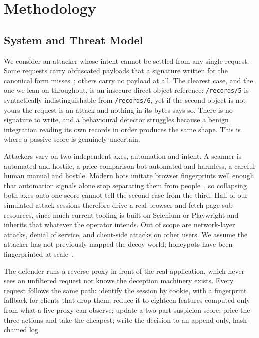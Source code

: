 \documentclass[runningheads]{llncs}
\begin{document}
\section{Methodology}

\subsection{System and Threat Model}
\label{sec:system}

We consider an attacker whose intent cannot be settled from any single request. Some
requests carry obfuscated payloads that a signature written for the canonical form
misses~\cite{amouei2022rat}; others carry no payload at all. The clearest case, and
the one we lean on throughout, is an insecure direct object reference:
\texttt{/records/5} is syntactically indistinguishable from \texttt{/records/6}, yet
if the second object is not yours the request is an attack and nothing in its bytes
says so. There is no signature to write, and a behavioural detector struggles because
a benign integration reading its own records in order produces the same shape. This
is where a passive score is genuinely uncertain.

Attackers vary on two independent axes, automation and intent. A scanner is
automated and hostile, a price-comparison bot automated and harmless, a careful
human manual and hostile. Modern bots imitate browser fingerprints well enough that
automation signals alone stop separating them from people~\cite{iliou2019towards},
so collapsing both axes onto one score cannot tell the second case from the third.
Half of our simulated attack sessions therefore drive a real browser and fetch page
sub-resources, since much current tooling is built on Selenium or Playwright and
inherits that whatever the operator intends. Out of scope are network-layer attacks,
denial of service, and client-side attacks on other users. We assume the attacker
has not previously mapped the decoy world; honeypots have been fingerprinted at
scale~\cite{vetterl2018bitter}.

The defender runs a reverse proxy in front of the real application, which never sees
an unfiltered request nor knows the deception machinery exists. Every request
follows the same path: identify the session by cookie, with a fingerprint fallback
for clients that drop them; reduce it to eighteen features computed only from what a
live proxy can observe; update a two-part suspicion score; price the three actions
and take the cheapest; write the decision to an append-only, hash-chained log.
\end{document}
